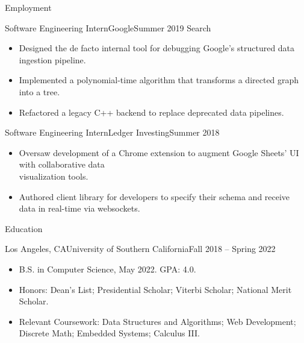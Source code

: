 \documentclass[calibri]{mcdowellcv}
\begin{document}
	\makeheader

	\begin{cvsection}{Employment}
		\begin{cvsubsection}{Software Engineering Intern}{Google}{Summer 2019}
		Search
			\begin{itemize}
				\item Designed the de facto internal tool for debugging Google's structured data ingestion pipeline.
				\item Implemented a polynomial-time algorithm that transforms a directed graph into a tree.
				\item Refactored a legacy C++ backend to replace deprecated data pipelines.
			\end{itemize}
		\end{cvsubsection}

		\begin{cvsubsection}{Software Engineering Intern}{Ledger Investing}{Summer 2018}
			\begin{itemize}
				\item Oversaw development of a Chrome extension to augment Google Sheets’ UI with collaborative data \\visualization tools.
				\item Authored client library for developers to specify their schema and receive data in real-time via websockets.
			\end{itemize}
		\end{cvsubsection}
	\end{cvsection}

	\begin{cvsection}{Education}
		\begin{cvsubsection}{Los Angeles, CA}{University of Southern California}{Fall 2018 -- Spring 2022}
			\begin{itemize}
				\item B.S. in Computer Science, May 2022.  GPA: 4.0.
				\item Honors: Dean's List; Presidential Scholar; Viterbi Scholar; National Merit Scholar.
				\item Relevant Coursework: Data Structures and Algorithms; Web Development; Discrete Math; Embedded Systems; Calculus III.
			\end{itemize}
		\end{cvsubsection}
	\end{cvsection}
\end{document}

